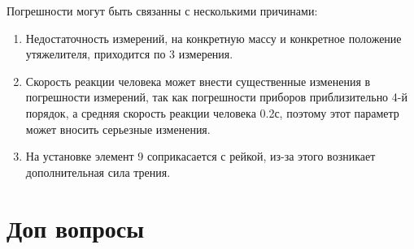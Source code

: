\documentclass[a4paper]{article}
\begin{document}
Погрешности могут быть связанны с несколькими причинами:

\begin{enumerate}
    \item Недостаточность измерений, на конкретную массу и конкретное положение утяжелителя, приходится по 3 измерения.
    \item Скорость реакции человека может внести существенные изменения в погрешности измерений, так как погрешности приборов приблизительно 4-й порядок, а средняя скорость реакции человека 0.2с, поэтому этот параметр может вносить серьезные изменения.
    \item На установке элемент 9 соприкасается с рейкой, из-за этого возникает дополнительная сила трения.
\end{enumerate}

\section{\textbf{Доп вопросы}}
\end{document}
